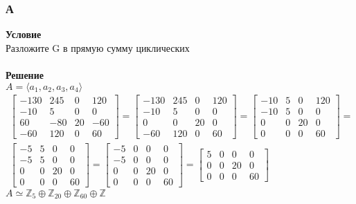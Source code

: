 		\subsubsection*{\textbf{А}}
		\textbf{Условие}\\
		Разложите G в прямую сумму циклических\\
		\\
		\textbf{Решение}\\
		$A = \langle a_1, a_2, a_3, a_4 \rangle$
		\begin{gather*}
			\begin{bmatrix}
				{-130} & {245} & {0} & {120} \\
				{-10} & {5} & {0} & {0} \\
				{60} & {-80} & {20} & {-60} \\
				{-60} & {120} & {0} & {60}
			\end{bmatrix}
			=
			\begin{bmatrix}
				{-130} & {245} & {0} & {120} \\
				{-10} & {5} & {0} & {0} \\
				{0} & {0} & {20} & {0} \\
				{-60} & {120} & {0} & {60}
			\end{bmatrix}
			=
			\begin{bmatrix}
				{-10} & {5} & {0} & {120} \\
				{-10} & {5} & {0} & {0} \\
				{0} & {0} & {20} & {0} \\
				{0} & {0} & {0} & {60}
			\end{bmatrix}
			=\\
			\begin{bmatrix}
				{-5} & {5} & {0} & {0} \\
				{-5} & {5} & {0} & {0} \\
				{0} & {0} & {20} & {0} \\
				{0} & {0} & {0} & {60}
			\end{bmatrix}
			=
			\begin{bmatrix}
				{-5} & {0} & {0} & {0} \\
				{-5} & {0} & {0} & {0} \\
				{0} & {0} & {20} & {0} \\
				{0} & {0} & {0} & {60}
			\end{bmatrix}
			=
			\begin{bmatrix}
				{5} & {0} & {0} & {0} \\
				{0} & {0} & {20} & {0} \\
				{0} & {0} & {0} & {60}
			\end{bmatrix}
		\end{gather*}
		$A \simeq \mathbb{Z}_5 \oplus \mathbb{Z}_20 \oplus \mathbb{Z}_60 \oplus \mathbb{Z}$\\
		
